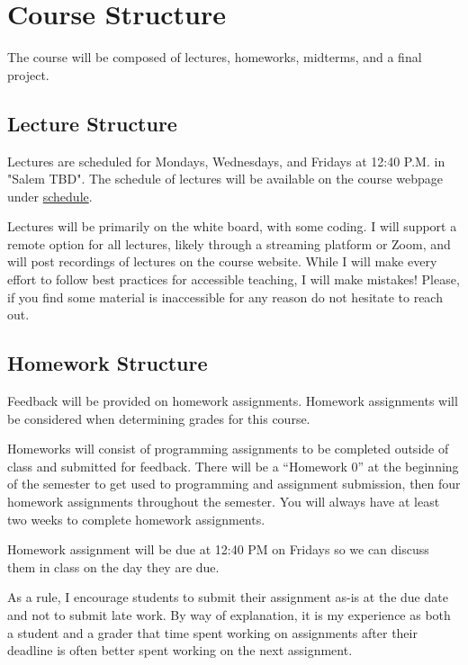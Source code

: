 \documentclass[11pt]{article}
\begin{document}

\section*{Course Structure}

The course will be composed of lectures, homeworks, midterms, and a final project.

\subsection*{Lecture Structure}

Lectures are scheduled for Mondays, Wednesdays, and Fridays at 12:40 P.M. in "Salem TBD". The schedule
of lectures will be available on the course webpage under \href{https://cd-public.github.io/courses/structures/s-241s22.html}{schedule}.

\bigskip
\noindent Lectures will be primarily on the white board, with some coding. I will support a remote option
for all lectures, likely through a streaming platform or Zoom, and will post recordings of lectures
on the course website. While I will make every effort to follow best practices for accessible teaching, I will make mistakes! Please, if you find some material is inaccessible for any reason
do not hesitate to reach out.

\subsection*{Homework Structure}

Feedback will be provided on homework assignments. Homework assignments will be considered when determining grades for this course.

\bigskip
\noindent Homeworks will consist of programming assignments to be completed outside of class and submitted
for feedback. There will be a ``Homework 0'' at the beginning of the semester to get used to
programming and assignment submission, then four homework assignments throughout the semester.
You will always have at least two weeks to complete homework assignments.

\bigskip
\noindent Homework assignment will be due at 12:40 PM on Fridays so we can discuss them in class on the 
day they are due.

\bigskip
\noindent As a rule, I encourage students to submit their assignment as-is at the due date and not to
submit late work. By way of explanation, it is my experience as both a student and a grader that time spent working on assignments after their deadline is often better spent working on the next assignment.
\end{document}
